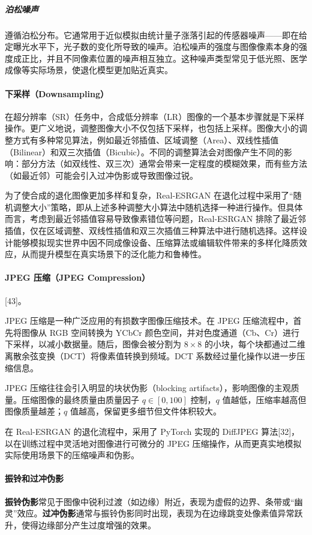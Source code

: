 \documentclass[12pt,AutoFakeBold]{article}
\begin{document}
\subparagraph{泊松噪声}遵循泊松分布。它通常用于近似模拟由统计量子涨落引起的传感器噪声——即在给定曝光水平下，光子数的变化所导致的噪声。泊松噪声的强度与图像像素本身的强度成正比，并且不同像素位置的噪声相互独立。这种噪声类型常见于低光照、医学成像等实际场景，使退化模型更加贴近真实。


\paragraph{下采样（Downsampling）}
在超分辨率（SR）任务中，合成低分辨率（LR）图像的一个基本步骤就是下采样操作。更广义地说，调整图像大小不仅包括下采样，也包括上采样。图像大小的调整方式有多种常见算法，例如最近邻插值、区域调整（Area）、双线性插值（Bilinear）和双三次插值（Bicubic）。不同的调整算法会对图像产生不同的影响：部分方法（如双线性、双三次）通常会带来一定程度的模糊效果，而有些方法（如最近邻）可能会引入过冲伪影或导致图像过锐。

为了使合成的退化图像更加多样和复杂，Real-ESRGAN 在退化过程中采用了“随机调整大小”策略，即从上述多种调整大小算法中随机选择一种进行操作。但具体而言，考虑到最近邻插值容易导致像素错位等问题，Real-ESRGAN 排除了最近邻插值，仅在区域调整、双线性插值和双三次插值三种算法中进行随机选择。这样设计能够模拟现实世界中因不同成像设备、压缩算法或编辑软件带来的多样化降质效应，从而提升模型在真实场景下的泛化能力和鲁棒性。



\paragraph{JPEG 压缩（JPEG Compression）}


[43]。


JPEG 压缩是一种广泛应用的有损数字图像压缩技术。在 JPEG 压缩流程中，首先将图像从 RGB 空间转换为 YCbCr 颜色空间，并对色度通道（Cb、Cr）进行下采样，以减小数据量。随后，图像会被分割为 $8 \times 8$ 的小块，每个块都通过二维离散余弦变换（DCT）将像素值转换到频域。DCT 系数经过量化操作以进一步压缩信息。

JPEG 压缩往往会引入明显的块状伪影（blocking artifacts），影响图像的主观质量。压缩图像的最终质量由质量因子 $q \in [0, 100]$ 控制，$q$ 值越低，压缩率越高但图像质量越差；$q$ 值越高，保留更多细节但文件体积较大。

在 Real-ESRGAN 的退化流程中，采用了 PyTorch 实现的 DiffJPEG 算法[32]，以在训练过程中灵活地对图像进行可微分的 JPEG 压缩操作，从而更真实地模拟实际使用场景下的压缩噪声和伪影。


\paragraph{振铃和过冲伪影}
\textbf{振铃伪影}常见于图像中锐利过渡（如边缘）附近，表现为虚假的边界、条带或“幽灵”效应。\textbf{过冲伪影}通常与振铃伪影同时出现，表现为在边缘跳变处像素值异常跃升，使得边缘部分产生过度增强的效果。  
\end{document}
